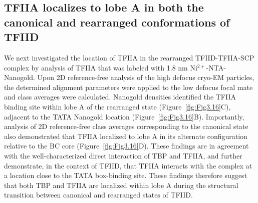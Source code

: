 \subsection{TFIIA localizes to lobe A in both the canonical and rearranged conformations of TFIID}
We next investigated the location of TFIIA in the rearranged TFIID-TFIIA-SCP complex by analysis of TFIIA that was labeled with 1.8 nm Ni$^{2+}$-NTA-Nanogold. Upon 2D reference-free analysis of the high defocus cryo-EM particles, the determined alignment parameters were applied to the low defocus focal mate and class averages were calculated. Nanogold densities identified the TFIIA binding site within lobe A of the rearranged state (Figure~\ref{fig:Fig3.16}C), adjacent to the TATA Nanogold location (Figure~\ref{fig:Fig3.16}B). Importantly, analysis of 2D reference-free class averages corresponding to the canonical state also demonstrated that TFIIA localized to lobe A in its alternate configuration relative to the BC core (Figure~\ref{fig:Fig3.16}D). These findings are in agreement with the well-characterized direct interaction of TBP and TFIIA, and further demonstrate, in the context of TFIID, that TFIIA interacts with the complex at a location close to the TATA box-binding site. These findings therefore suggest that both TBP and TFIIA are localized within lobe A during the structural transition between canonical and rearranged states of TFIID.

